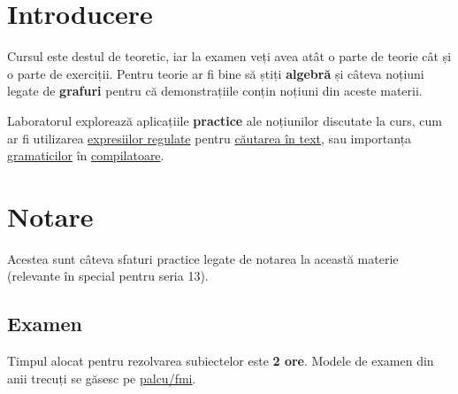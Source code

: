 \section*{Introducere}

Cursul este destul de teoretic, iar la examen veți avea atât o parte de teorie cât și o parte de exerciții. Pentru teorie ar fi bine să știți \textbf{algebră} și câteva noțiuni legate de \textbf{grafuri} pentru că demonstrațiile conțin noțiuni din aceste materii.

Laboratorul explorează aplicațiile \textbf{practice} ale noțiunilor discutate la curs, cum ar fi utilizarea \href{https://en.wikipedia.org/wiki/Regular_expression}{expresiilor regulate} pentru \href{https://docs.python.org/3/library/re.html}{căutarea în text}, sau importanța \href{https://en.wikipedia.org/wiki/Formal_grammar}{gramaticilor} în \href{https://en.wikipedia.org/wiki/LALR_parser}{compilatoare}.

\newpage

\section*{Notare}

Acestea sunt câteva sfaturi practice legate de notarea la această materie (relevante în special pentru seria 13).

\subsection*{Examen}

Timpul alocat pentru rezolvarea subiectelor este \textbf{2 ore}. Modele de examen din anii trecuți se găsesc pe \href{https://github.com/palcu/fmi/blob/master/lfa.md}{palcu/fmi}.

